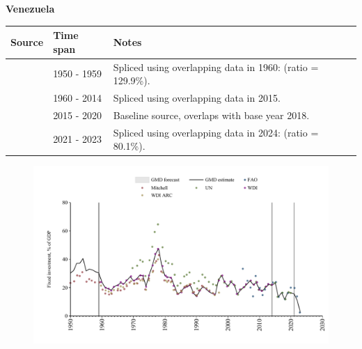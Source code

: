 \documentclass[12pt,a4paper,landscape]{article}
\begin{document}
\begin{adjustbox}{max totalsize={\paperwidth}{\paperheight},center}
\begin{minipage}[t][\textheight][t]{\textwidth}
\vspace*{0.5cm}
{}
\begin{center}
{\Large\bfseries Venezuela}
\end{center}
\vspace{0.5cm}
\begin{table}[H]
\centering
\small
\begin{tabular}{|l|l|l|}
\hline
\textbf{Source} & \textbf{Time span} & \textbf{Notes} \\
\hline
\rowcolor{white}\cite{Mitchell}& 1950 - 1959 &Spliced using overlapping data in 1960: (ratio = 129.9\%).\\
\rowcolor{lightgray}\cite{WDI}& 1960 - 2014 &Spliced using overlapping data in 2015.\\
\rowcolor{white}\cite{UN}& 2015 - 2020 &Baseline source, overlaps with base year 2018.\\
\rowcolor{lightgray}\cite{FAO}& 2021 - 2023 &Spliced using overlapping data in 2024: (ratio = 80.1\%).\\
\hline
\end{tabular}
\end{table}
\begin{figure}[H]
\centering
\includegraphics[width=\textwidth,height=0.6\textheight,keepaspectratio]{graphs/VEN_finv_GDP.pdf}
\end{figure}
\end{minipage}
\end{adjustbox}
\end{document}
